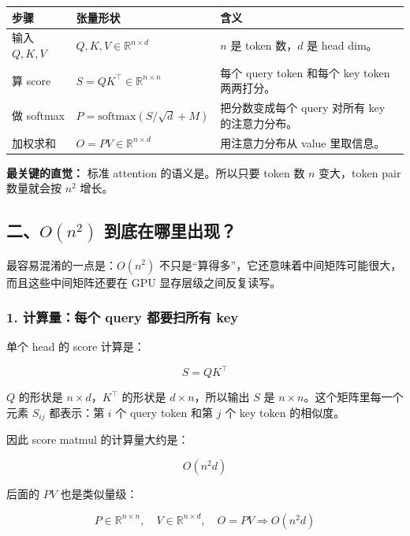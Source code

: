 \begin{center}
{\small
\begin{tabular}{p{3.2cm}p{4.2cm}p{5.4cm}}
\hline
\textbf{步骤} & \textbf{张量形状} & \textbf{含义} \\
\hline
输入 $Q,K,V$ & $Q,K,V \in \mathbb{R}^{n \times d}$ & $n$ 是 token 数，$d$ 是 head dim。 \\
算 score & $S = QK^\top \in \mathbb{R}^{n \times n}$ & 每个 query token 和每个 key token 两两打分。 \\
做 softmax & $P = \mathrm{softmax}(S / \sqrt{d} + M)$ & 把分数变成每个 query 对所有 key 的注意力分布。 \\
加权求和 & $O = PV \in \mathbb{R}^{n \times d}$ & 用注意力分布从 value 里取信息。 \\
\hline
\end{tabular}
}
\end{center}

\begin{intubox}
\textbf{最关键的直觉：} 标准 attention 的语义是。所以只要 token 数 $n$ 变大，token pair 数量就会按 $n^2$ 增长。
\end{intubox}

\subsection{二、$O(n^2)$ 到底在哪里出现？}

最容易混淆的一点是：$O(n^2)$ 不只是“算得多”，它还意味着中间矩阵可能很大，而且这些中间矩阵还要在 GPU 显存层级之间反复读写。

\subsubsection*{1. 计算量：每个 query 都要扫所有 key}

单个 head 的 score 计算是：

\[
S = QK^\top
\]

$Q$ 的形状是 $n \times d$，$K^\top$ 的形状是 $d \times n$，所以输出 $S$ 是 $n \times n$。这个矩阵里每一个元素 $S_{ij}$ 都表示：第 $i$ 个 query token 和第 $j$ 个 key token 的相似度。

因此 score matmul 的计算量大约是：

\[
O(n^2 d)
\]

后面的 $PV$ 也是类似量级：

\[
P \in \mathbb{R}^{n \times n},\quad V \in \mathbb{R}^{n \times d},\quad O=PV \Rightarrow O(n^2 d)
\]

